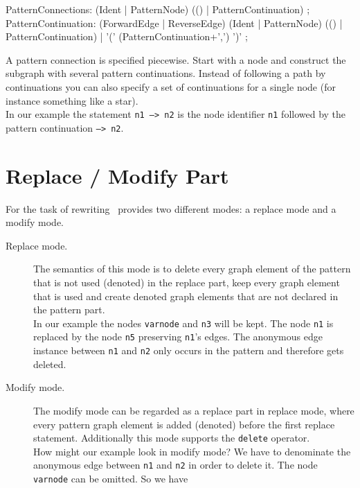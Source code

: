 \begin{rail}     
  PatternConnections: (Ident | PatternNode) (() | PatternContinuation) ;
  PatternContinuation: (ForwardEdge | ReverseEdge) (Ident | PatternNode) (() | PatternContinuation) |
    '(' (PatternContinuation+',') ')' ; 
\end{rail}
A pattern connection is specified piecewise. Start with a node and construct the subgraph with several pattern continuations. Instead of following a path by continuations you can also specify a set of continuations for a single node (for instance something like a star).\\
In our example the statement \texttt{n1 --> n2} is the node identifier \texttt{n1} followed by the pattern continuation \texttt{--> n2}.

\section{Replace / Modify Part}
\label{replacepart}
For the task of rewriting \GrG\ provides two different modes: a replace mode and a modify mode.
\begin{description}
  \item[Replace mode.] The semantics of this mode is to delete every graph element of the pattern that is not used (denoted) in the replace part, keep every graph element that is used and create denoted graph elements that are not declared in the pattern part.\\
  In our example the nodes \texttt{varnode} and \texttt{n3} will be kept. The node \texttt{n1} is replaced by the node \texttt{n5} preserving \texttt{n1}'s edges. The anonymous edge instance between \texttt{n1} and \texttt{n2} only occurs in the pattern and therefore gets deleted.
  \item[Modify mode.] The modify mode can be regarded as a replace part in replace mode, where every pattern graph element is added (denoted) before the first replace statement. Additionally this mode supports the \texttt{delete} operator.\\
  How might our example look in modify mode? We have to denominate the anonymous edge between \texttt{n1} and \texttt{n2} in order to delete it. The node \texttt{varnode} can be omitted. So we have
\begin{grgen}
rule SomeRuleExt(varnode: Node): (Node, EdgeTypeB) {
  pattern {
    ...
    n1 -e0:Edge-> n2;
    ...
  }
  modify {
    n5 : NodeTypeC<n1>;
    n3 -e1:EdgeTypeB-> n5;
    delete(e0);
    eval {
      ...
\end{grgen}
\end{description}


